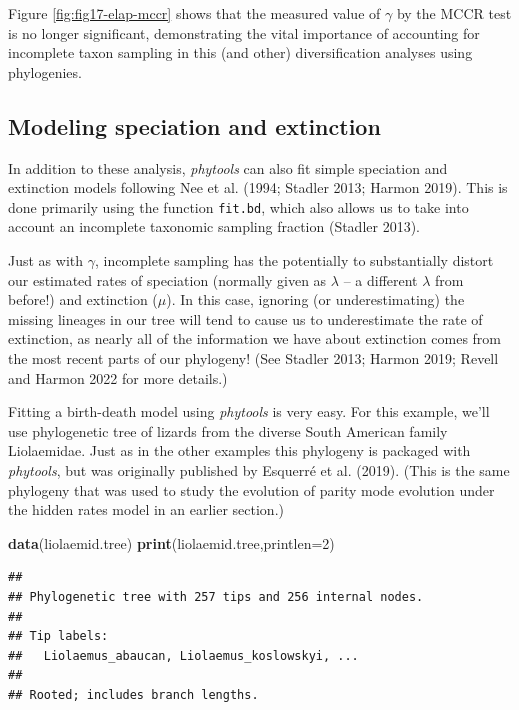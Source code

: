 \documentclass[fleqn,10pt,lineno]{wlpeerj} %
\newenvironment{Shaded}{\begin{snugshade}}{\end{snugshade}}
\newcommand{\AttributeTok}[1]{\textcolor[rgb]{0.13,0.29,0.53}{#1}}
\newcommand{\DecValTok}[1]{\textcolor[rgb]{0.00,0.00,0.81}{#1}}
\newcommand{\FunctionTok}[1]{\textcolor[rgb]{0.13,0.29,0.53}{\textbf{#1}}}
\newcommand{\NormalTok}[1]{#1}
\begin{document}
Figure \ref{fig:fig17-elap-mccr} shows that the measured value of \(\gamma\) by the MCCR test is no longer significant, demonstrating the vital importance of accounting for incomplete taxon sampling in this (and other) diversification analyses using phylogenies.

\hypertarget{modeling-speciation-and-extinction}{%
\subsection{Modeling speciation and extinction}\label{modeling-speciation-and-extinction}}

In addition to these analysis, \emph{phytools} can also fit simple speciation and extinction models following Nee et al. (1994; Stadler 2013; Harmon 2019). This is done primarily using the function \texttt{fit.bd}, which also allows us to take into account an incomplete taxonomic sampling fraction (Stadler 2013).

Just as with \(\gamma\), incomplete sampling has the potentially to substantially distort our estimated rates of speciation (normally given as \(\lambda\) -- a different \(\lambda\) from before!) and extinction (\(\mu\)). In this case, ignoring (or underestimating) the missing lineages in our tree will tend to cause us to underestimate the rate of extinction, as nearly all of the information we have about extinction comes from the most recent parts of our phylogeny! (See Stadler 2013; Harmon 2019; Revell and Harmon 2022 for more details.)

Fitting a birth-death model using \emph{phytools} is very easy. For this example, we'll use phylogenetic tree of lizards from the diverse South American family Liolaemidae. Just as in the other examples this phylogeny is packaged with \emph{phytools}, but was originally published by Esquerré et al. (2019). (This is the same phylogeny that was used to study the evolution of parity mode evolution under the hidden rates model in an earlier section.)

\begin{Shaded}
\begin{Highlighting}[]
\FunctionTok{data}\NormalTok{(liolaemid.tree)}
\FunctionTok{print}\NormalTok{(liolaemid.tree,}\AttributeTok{printlen=}\DecValTok{2}\NormalTok{)}
\end{Highlighting}
\end{Shaded}

\begin{verbatim}
## 
## Phylogenetic tree with 257 tips and 256 internal nodes.
## 
## Tip labels:
##   Liolaemus_abaucan, Liolaemus_koslowskyi, ...
## 
## Rooted; includes branch lengths.
\end{verbatim}
\end{document}

